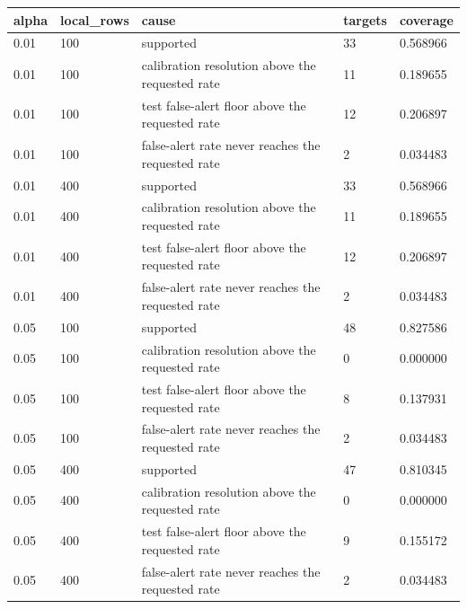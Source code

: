 \begin{tabular}{lllll}
\toprule
alpha & local\_rows & cause & targets & coverage \\
\midrule
0.01 & 100 & supported & 33 & 0.568966 \\
0.01 & 100 & calibration resolution above the requested rate & 11 & 0.189655 \\
0.01 & 100 & test false-alert floor above the requested rate & 12 & 0.206897 \\
0.01 & 100 & false-alert rate never reaches the requested rate & 2 & 0.034483 \\
0.01 & 400 & supported & 33 & 0.568966 \\
0.01 & 400 & calibration resolution above the requested rate & 11 & 0.189655 \\
0.01 & 400 & test false-alert floor above the requested rate & 12 & 0.206897 \\
0.01 & 400 & false-alert rate never reaches the requested rate & 2 & 0.034483 \\
0.05 & 100 & supported & 48 & 0.827586 \\
0.05 & 100 & calibration resolution above the requested rate & 0 & 0.000000 \\
0.05 & 100 & test false-alert floor above the requested rate & 8 & 0.137931 \\
0.05 & 100 & false-alert rate never reaches the requested rate & 2 & 0.034483 \\
0.05 & 400 & supported & 47 & 0.810345 \\
0.05 & 400 & calibration resolution above the requested rate & 0 & 0.000000 \\
0.05 & 400 & test false-alert floor above the requested rate & 9 & 0.155172 \\
0.05 & 400 & false-alert rate never reaches the requested rate & 2 & 0.034483 \\
\bottomrule
\end{tabular}
